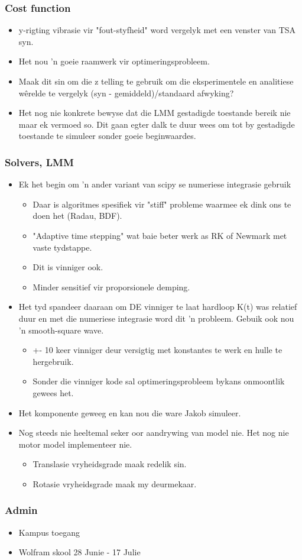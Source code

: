 \documentclass{beamer}
\begin{document}
\begin{frame}
\frametitle{Cost function}
\begin{itemize}
	\item y-rigting vibrasie vir "fout-styfheid" word vergelyk met een venster van TSA syn. 
	\item Het nou 'n goeie raamwerk vir optimeringsprobleem.
	\item Maak dit sin om die z telling te gebruik om die eksperimentele en analitiese wêrelde te vergelyk (syn - gemiddeld)/standaard afwyking? 
	\item Het nog nie konkrete bewyse dat die LMM gestadigde toestande bereik nie maar ek vermoed so. Dit gaan egter dalk te duur wees om tot by gestadigde toestande te simuleer sonder goeie beginwaardes.
\end{itemize}
\end{frame}

\begin{frame}
\frametitle{Solvers, LMM}
\begin{itemize}
	\item Ek het begin om 'n ander variant van scipy se numeriese integrasie gebruik
		\begin{itemize}
			\item Daar is algoritmes spesifiek vir "stiff" probleme waarmee ek dink ons te doen het (Radau, BDF).
			\item "Adaptive time stepping" wat baie beter werk as RK of Newmark met vaste tydstappe. 
			\item Dit is vinniger ook.
			\item Minder sensitief vir proporsionele demping.
		\end{itemize}
	\item Het tyd spandeer daaraan om DE vinniger te laat hardloop K(t) was relatief duur en met die numeriese integrasie word dit 'n probleem. Gebuik ook nou 'n smooth-square wave.
	\begin{itemize}
		\item +- 10 keer vinniger deur versigtig met konstantes te werk en hulle te hergebruik. 
		\item Sonder die vinniger kode sal optimeringsprobleem bykans onmoontlik gewees het.
	\end{itemize}
	\item Het komponente geweeg en kan nou die ware Jakob simuleer.
	\item Nog steeds nie heeltemal seker oor aandrywing van model nie. Het nog nie motor model implementeer nie.
		\begin{itemize}
		\item Translasie vryheidsgrade maak redelik sin.
		\item Rotasie vryheidsgrade maak my deurmekaar.
	\end{itemize}
\end{itemize}
\end{frame}


\begin{frame}
\frametitle{Admin}
\begin{itemize}
	\item Kampus toegang
	\item Wolfram skool 28 Junie - 17 Julie

\end{itemize}
\end{frame}
\end{document}

